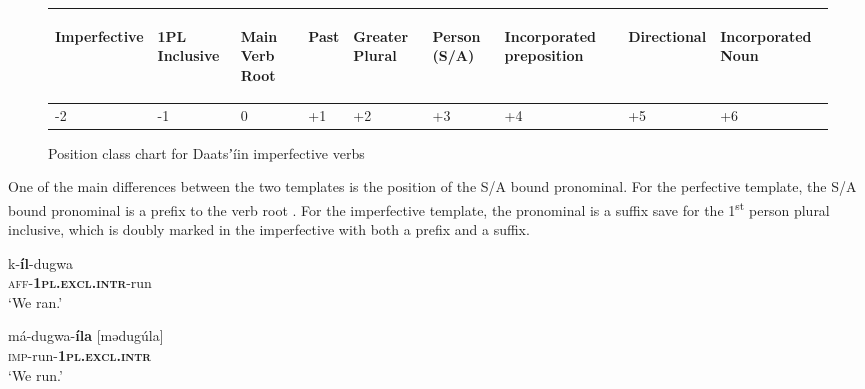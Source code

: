 \documentclass[output=paper]{langsci/langscibook}
\begin{document}
\begin{figure}
\begin{tabularx}{\textwidth}{XXXXXXXXp{3cm}}
\begin{turn}{33} Imperfective \end{turn} & \begin{turn}{33} 1PL Inclusive \end{turn} & \begin{turn}{33} Main Verb Root \end{turn} & \begin{turn}{33} Past \end{turn} & \begin{turn}{33} Greater Plural \end{turn} & \begin{turn}{33} Person (S/A) \end{turn} & \begin{turn}{33} Incorporated preposition \end{turn} & \begin{turn}{33} Directional \end{turn} & \begin{turn}{33} Incorporated Noun \end{turn} \\ \midrule
\multicolumn{1}{X}{{}-2} & \multicolumn{1}{X}{{}-1} & \multicolumn{1}{X}{0} & \multicolumn{1}{X}{+1} & \multicolumn{1}{X}{+2} & \multicolumn{1}{X}{+3} & \multicolumn{1}{X}{+4} & \multicolumn{1}{X}{+5} & +6\\
\end{tabularx}
\caption{Position class chart for Daatsʼíin imperfective verbs}
\label{fig:ahlandc:3}
\end{figure}

One of the main differences between the two templates is the position of the S/A bound pronominal. For the perfective template, the S/A bound pronominal is a prefix to the verb root . For the imperfective template, the pronominal is a suffix  save for the 1\textsuperscript{st} person plural inclusive, which is doubly marked in the imperfective with both a prefix and a suffix. 

\ea\label{ex:ahlandc:6}
\gll 
k-\textbf{íl}{}-dugwa \\
\textsc{aff}{}-\textbf{\textsc{1pl.excl.intr}}{}-run \\
\glt
‘We ran.’
\z

\ea\label{ex:ahlandc:7}
\gll 
má-dugwa-\textbf{íla}   [mədug\'{u}la] \\
\textsc{imp}{}-run-\textbf{\textsc{1pl.excl.intr}} \\
\glt 
 ‘We run.’
\z
\end{document}
